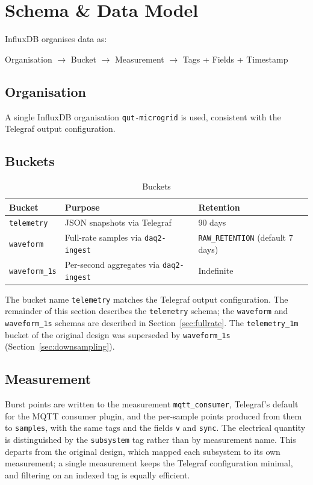 \section{Schema \& Data Model}
InfluxDB organises data as:
\begin{center}
Organisation $\rightarrow$ Bucket $\rightarrow$ Measurement $\rightarrow$ Tags + Fields + Timestamp
\end{center}

\subsection{Organisation}
A single InfluxDB organisation \texttt{qut-microgrid} is used, consistent with the Telegraf output configuration.

\subsection{Buckets}
\begin{table}[H]
  \caption{Buckets}
  \begin{center}
    \begin{tabular}{lll}
      \hline
      \textbf{Bucket} & \textbf{Purpose} & \textbf{Retention} \\
      \hline
      \texttt{telemetry} & JSON snapshots via Telegraf & 90 days \\
      \texttt{waveform} & Full-rate samples via \texttt{daq2-ingest} & \texttt{RAW\_RETENTION} (default 7 days) \\
      \texttt{waveform\_1s} & Per-second aggregates via \texttt{daq2-ingest} & Indefinite \\
      \hline
    \end{tabular}
  \end{center}
\end{table}

The bucket name \texttt{telemetry} matches the Telegraf output configuration. The remainder of this section describes the \texttt{telemetry} schema; the \texttt{waveform} and \texttt{waveform\_1s} schemas are described in Section~\ref{sec:fullrate}. The \texttt{telemetry\_1m} bucket of the original design was superseded by \texttt{waveform\_1s} (Section~\ref{sec:downsampling}).

\subsection{Measurement}
Burst points are written to the measurement \texttt{mqtt\_consumer}, Telegraf's default for the MQTT consumer plugin, and the per-sample points produced from them to \texttt{samples}, with the same tags and the fields \texttt{v} and \texttt{sync}. The electrical quantity is distinguished by the \texttt{subsystem} tag rather than by measurement name. This departs from the original design, which mapped each subsystem to its own measurement; a single measurement keeps the Telegraf configuration minimal, and filtering on an indexed tag is equally efficient.

